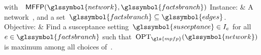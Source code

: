 \begin{problem}[framed]{\MFFP 
with~~$\mffp(\glssymbol{network},\glssymbol{factsbranch})$}%
    Instance:  & A network~, and a
    set~$\glssymbol{factsbranch}\subseteq\glssymbol{edges}$.\\
    Objective: & Find a susceptance
    setting~$\glssymbol{susceptance}\in\interval_{\edge}$ for
    all~$\edge\in\glssymbol{factsbranch}$ such
    that~$\opt_{\gls{mpfp}}(\glssymbol{network})$ is maximum among all choices
    of~.
\end{problem}%